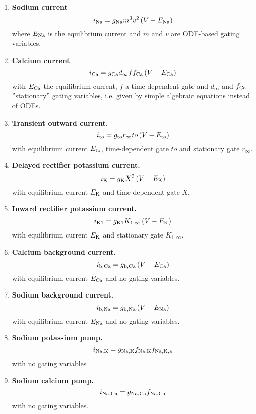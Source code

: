 \documentclass{scrartcl}
\begin{document}
\begin{enumerate}
\item {\bf Sodium current}
\begin{equation}
	i_{\rm Na} = g_{\rm Na} m^3 v^2 \left( V - E_{\rm Na} \right)
\end{equation}
where $E_{\rm Na}$ is the equilibrium current and $m$ and $v$ are ODE-based gating variables.
\item {\bf Calcium current}
\begin{equation}
	i_{\rm Ca} = g_{\rm Ca} d_{\infty} f f_{\rm Ca} \left( V - E_{\rm Ca} \right)
\end{equation}
with $E_{\rm Ca}$ the equilibrium current, $f$ a time-dependent gate and  $d_{\infty}$ and $f_{\rm Ca}$ ''stationary'' gating variables, i.e. given by simple algebraic equations instead of ODEs.
\item {\bf Transient outward current.}
\begin{equation}
	i_{\rm to} = g_{\rm to} r_{\infty} to \left( V - E_{\rm to} \right)
\end{equation}
with equilibrium current $E_{\rm to}$, time-dependent gate $to$ and stationary gate $r_{\infty}$.
\item {\bf Delayed rectifier potassium current.}
\begin{equation}
	i_{\rm K} = g_{\rm K} X^2 \left( V - E_{\rm K} \right)
\end{equation}
with equilibrium current $E_{\rm K}$ and time-dependent gate $X$.
\item {\bf Inward rectifier potassium current.}
\begin{equation}
	i_{\rm K1} = g_{\rm K1} K_{1, \infty} \left( V - E_{\rm K} \right)
\end{equation}
with equilibrium current $E_{\rm K}$ and stationary gate $K_{1, \infty}$.
\item {\bf Calcium background current.}
\begin{equation}
	i_{\rm b, Ca} = g_{\rm b, Ca} \left( V - E_{\rm Ca} \right)
\end{equation}
with equilibrium current $E_{\rm Ca}$ and no gating variables.
\item {\bf Sodium background current.}
\begin{equation}
	i_{\rm b, Na} = g_{\rm b, Na} \left( V - E_{\rm Na} \right)
\end{equation}
with equilibrium current $E_{\rm Na}$ and no gating variables.
\item {\bf Sodium potassium pump.}
\begin{equation}
	i_{\rm Na, K} = g_{\rm Na, K} f_{\rm Na, K} f_{\rm Na, K, a}
\end{equation}
with no gating variables
\item {\bf Sodium calcium pump.}
\begin{equation}
	i_{\rm Na, Ca} = g_{\rm Na, Ca} f_{\rm Na, Ca}
\end{equation}
with no gating variables.
\end{enumerate}
%
%
\end{document}
